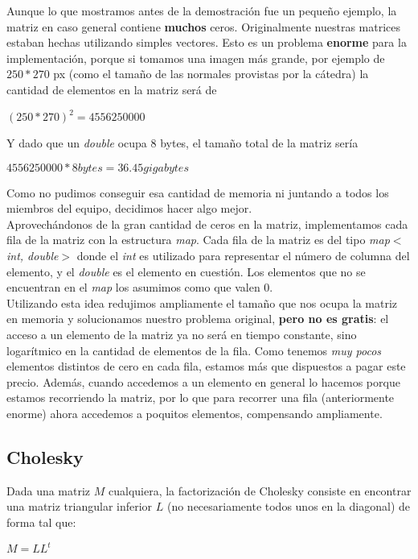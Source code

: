 Aunque lo que mostramos antes de la demostración fue un pequeño ejemplo, la matriz en caso general contiene \textbf{muchos} ceros. Originalmente nuestras matrices estaban hechas utilizando simples vectores. Esto es un problema \textbf{enorme} para la implementación, porque si tomamos una imagen más grande, por ejemplo de $250*270$ px (como el tamaño de las normales provistas por la cátedra) la cantidad de elementos en la matriz será de
\begin{center}
    $(250*270)^2 = 4 556 250 000$
\end{center}

Y dado que un \textit{double} ocupa 8 bytes, el tamaño total de la matriz sería
\begin{center}
    $4 556 250 000 * 8 bytes = 36.45 gigabytes$
\end{center}

Como no pudimos conseguir esa cantidad de memoria ni juntando a todos los miembros del equipo, decidimos hacer algo mejor. \\

Aprovechándonos de la gran cantidad de ceros en la matriz, implementamos cada fila de la matriz con la estructura \textit{map}. Cada fila de la matriz es del tipo \textit{map$<$int, double$>$} donde el \textit{int} es utilizado para representar el número de columna del elemento, y el \textit{double} es el elemento en cuestión. Los elementos que no se encuentran en el \textit{map} los asumimos como que valen 0. \\

Utilizando esta idea redujimos ampliamente el tamaño que nos ocupa la matriz en memoria y solucionamos nuestro problema original, \textbf{pero no es gratis}: el acceso a un elemento de la matriz ya no será en tiempo constante, sino logarítmico en la cantidad de elementos de la fila. Como tenemos \textit{muy pocos} elementos distintos de cero en cada fila, estamos más que dispuestos a pagar este precio. Además, cuando accedemos a un elemento en general lo hacemos porque estamos recorriendo la matriz, por lo que para recorrer una fila (anteriormente enorme) ahora accedemos a poquitos elementos, compensando ampliamente. \\

\subsection{Cholesky}

Dada una matriz $M$ cualquiera, la factorización de Cholesky consiste en encontrar una matriz triangular inferior $L$ (no necesariamente todos unos en la diagonal) de forma tal que:
\begin{center}
$M = L L^t$
\end{center}

